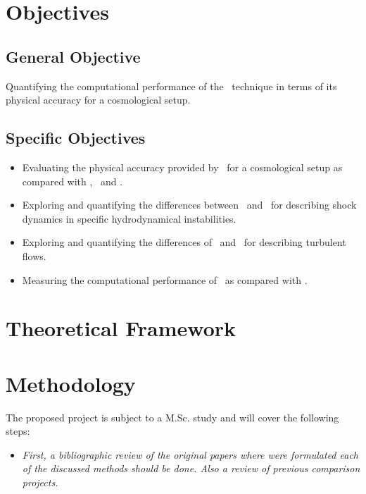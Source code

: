 \documentclass[a4,useAMS,usenatbib,usegraphicx,12pt]{article}
\begin{document}
\section{Objectives}
\subsection*{General Objective}
Quantifying the computational performance of the \VPH\ technique in terms of 
its physical accuracy for a cosmological setup.


\subsection*{Specific Objectives}
\begin{itemize}
\item Evaluating the physical accuracy provided by \VPH\ for a cosmological 
setup as compared with \AMR, \SPH\ and \AREPO.
\item Exploring and quantifying the differences between \VPH\ and \AMR\ for 
describing shock dynamics in specific hydrodynamical instabilities.
\item Exploring and quantifying the differences of \VPH\ and \SPH\ for 
describing turbulent flows.
\item Measuring the computational performance of \VPH\ as compared with \AREPO.
\end{itemize}


\section{Theoretical Framework}


\section{Methodology}
The proposed project is subject to a M.Sc. study and will cover the following 
steps:


\begin{itemize}
\item[\checkmark] \textit{First, a bibliographic review of the original papers 
where were formulated each of the discussed methods should be done. Also a 
review of previous comparison projects.}
\end{itemize}
\end{document}
